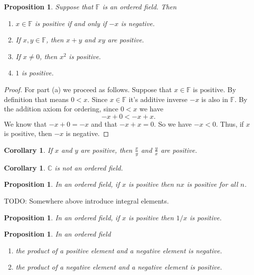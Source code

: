 \documentclass[11pt]{article}
\newtheorem{proposition}[theorem]{Proposition}
\newtheorem{corollary}[theorem]{Corollary}
\theoremstyle{definition}
\begin{document}
\begin{proposition}
  Suppose that $\mathbb{F}$ is an ordered field. Then
  \begin{enumerate}
    \item[(a)] $x\in \mathbb{F}$ is positive if and only if $-x$ is negative.
    \item[(b)] If $x,y \in \mathbb{F}$, then $x+y$ and $xy$ are positive.
    \item[(c)] If $x\neq 0$, then $x^2$ is positive.
    \item[(d)] $1$ is positive.
  \end{enumerate}
\end{proposition}
\begin{proof}
  For part (a) we proceed as follows. Suppose that $x\in\mathbb{F}$ is positive. By definition that means $0 < x$. Since $x\in\mathbb{F}$ it's additive
  inverse $-x$ is also in $\mathbb{F}$. By the addition axiom for ordering, since $0 < x$ we have
  \[ -x + 0 < -x + x.\]
  We know that $-x+0 = -x$ and that $-x + x = 0$. So we have $-x < 0$. Thus, if $x$ is positive, then $-x$ is negative.
\end{proof}

\begin{corollary}
  If $x$ and $y$ are positive, then $\frac{x}{y}$ and $\frac{y}{x}$ are positive.
\end{corollary}

\begin{corollary}
  $\mathbb{C}$ is not an ordered field.
\end{corollary}

\begin{proposition}
  In an ordered field, if $x$ is positive then $nx$ is positive for all $n$.
\end{proposition}

TODO: Somewhere above introduce integral elements.

\begin{proposition}
  In an ordered field, if $x$ is positive then $1/x$ is positive.
\end{proposition}

\begin{proposition} In an ordered field
  \begin{enumerate}
    \item[(a)] the product of a positive element and a negative element is negative.
    \item[(b)] the product of a negative element and a negative element is positive.
  \end{enumerate}
\end{proposition}
\end{document}
